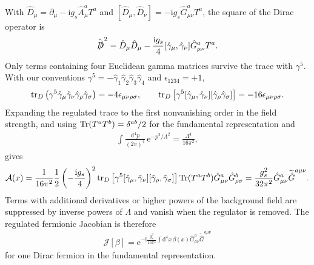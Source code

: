 \documentclass[review]{elsarticle}
\numberwithin{equation}{section}
\numberwithin{table}{section}
\numberwithin{figure}{section}
\def\d{\mathrm{d}}
\def\i{\mathrm{i}}
\def\e{\mathrm{e}}
\begin{document}
With $\hat D_\mu=\partial_\mu-\i g_s\hat A_\mu^aT^a$ and $[\hat D_\mu,\hat D_\nu]=-\i g_s\hat G_{\mu\nu}^aT^a$, the square of the Dirac operator is
\begin{align}
    \hat{\slashed{D}}^{2} = \hat D_\mu\hat D_\mu -
    \frac{\i g_s}{4} [\hat\gamma_\mu,\hat\gamma_\nu] \hat G_{\mu\nu}^a T^a.
    \label{eq:Fujikawa-Dirac-square}
\end{align}
Only terms containing four Euclidean gamma matrices survive the trace with $\gamma^5$. With our conventions $\gamma^5=-\hat\gamma_1\hat\gamma_2\hat\gamma_3\hat\gamma_4$ and $\epsilon_{1234}=+1$,
\begin{align}
    {\rm tr}_{D}
    \left(\gamma^5 \hat\gamma_\mu \hat\gamma_\nu \hat\gamma_\rho \hat\gamma_\sigma \right)
    = -4\epsilon_{\mu\nu\rho\sigma},
    \qquad
    {\rm tr}_{D} \left[ \gamma^5 [\hat\gamma_\mu,\hat\gamma_\nu] [\hat\gamma_\rho \hat\gamma_\sigma] \right]
    = -16\epsilon_{\mu\nu\rho\sigma}.
    \label{eq:Fujikawa-gamma-trace}
\end{align}
Expanding the regulated trace to the first nonvanishing order in the field strength, and using ${\rm Tr}(T^aT^b)=\delta^{ab}/2$ for the fundamental representation and
\begin{align}
    \int\frac{\d^4p}{(2\pi)^4}\, \e^{-p^2/\Lambda^2} = \frac{\Lambda^4}{16\pi^2},
\end{align}
gives
\begin{align}
    \mathcal A(x)
    = \frac{1}{16\pi^2} \frac{1}{2} \left(-\frac{\i g_s}{4}\right)^2 {\rm tr}_{D}
    \left[\gamma^5[\hat\gamma_\mu,\hat\gamma_\nu][\hat\gamma_\rho,\hat\gamma_\sigma]\right]
    {\rm Tr}(T^aT^b) \hat G_{\mu\nu}^a \hat G_{\rho\sigma}^b
    =
    \frac{g_s^2}{32\pi^2} \hat G_{\mu\nu}^a \widetilde{\hat G}^{a\mu\nu}.
    \label{eq:Fujikawa-regulated-anomaly}
\end{align}
Terms with additional derivatives or higher powers of the background field are suppressed by inverse powers of $\Lambda$ and vanish when the regulator is removed. The regulated fermionic Jacobian is therefore
\begin{align}
    \mathcal J[\beta]
    = \e^{ -\i \frac{g_s^2}{16\pi^2} \int\d^4x\, \beta(x) \hat G_{\mu\nu}^a \widetilde{\hat G}^{a\mu\nu}}
    \label{eq:Fujikawa-final-Jacobian}
\end{align}
for one Dirac fermion in the fundamental representation.
\end{document}
